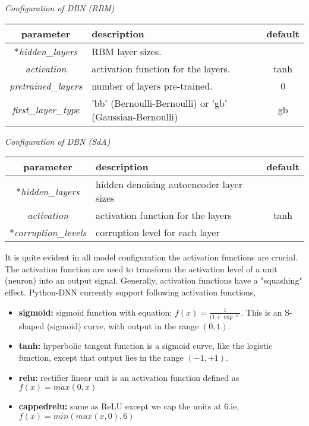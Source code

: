 \begin{table}[!htbp] 
 \begin{center}
  	\medskip  \small \textit{Configuration of DBN (RBM)}
	\begin{tabular}{|c|p{8cm}|c|} \hline
   	\textbf{parameter} & \textbf{description} & \textbf{default}\\  \hline
	*\emph{hidden\_layers} &  RBM layer sizes. & \\ \hline
	\emph{activation} & activation function for the layers. & tanh \\ \hline
	\emph{pretrained\_layers} & number of layers  pre-trained. & 0 \\ \hline
	\emph{first\_layer\_type} & 'bb' (Bernoulli-Bernoulli) or 'gb' (Gaussian-Bernoulli) & gb  \\ 	\hline 
	\end{tabular}		
\end{center}
\end{table} 
\begin{table}[!htbp] 
 \begin{center}
  	\medskip  \small \textit{Configuration of DBN (SdA)}
	\begin{tabular}{|c|p{8cm}|c|} \hline
   	\textbf{parameter} & \textbf{description} & \textbf{default}\\  \hline
	*\emph{hidden\_layers} &  hidden denoising autoencoder layer sizes & \\ \hline
	\emph{activation} & activation function for the layers & tanh \\ \hline
	*\emph{corruption\_levels} & corruption level for each layer &  \\ \hline
	\end{tabular}		
\end{center} 
\end{table} 
\noindent It is quite evident in all model configuration the activation functions are crucial.  The activation function are used to transform the activation level of a unit (neuron) into an output signal.  Generally, activation functions have a "squashing" effect.  Python-DNN currently support following activation functions,
\begin{itemize}
\item {\textbf{sigmoid:} sigmoid function with equation: $f(x) = \frac{1}{(1 + \exp^{-x}}$. This is an S-shaped (sigmoid) curve, with output in the range $(0,1)$.}
\item {\textbf{tanh:} hyperbolic tangent function is a sigmoid curve, like the logistic function, except that output lies in the range $(-1,+1)$.} 
\item {\textbf{relu:} rectifier linear unit is an activation function defined as $f(x) = max(0, x)$}
\item {\textbf{cappedrelu:} same as ReLU except we cap the units at 6.ie, $f(x) = min(max(x,0),6)$}
\end{itemize}
\clearpage

